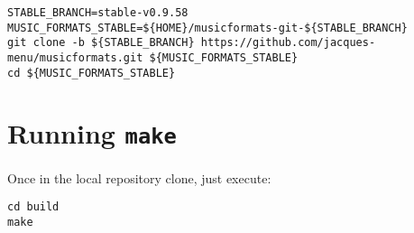 \begin{lstlisting}[language=Terminal]
STABLE_BRANCH=stable-v0.9.58
MUSIC_FORMATS_STABLE=${HOME}/musicformats-git-${STABLE_BRANCH}
git clone -b ${STABLE_BRANCH} https://github.com/jacques-menu/musicformats.git ${MUSIC_FORMATS_STABLE}
cd ${MUSIC_FORMATS_STABLE}
\end{lstlisting}


\section{Running {\tt make}}

Once in the local repository clone, just execute:
\begin{lstlisting}[language=Terminal]
cd build
make
\end{lstlisting}

